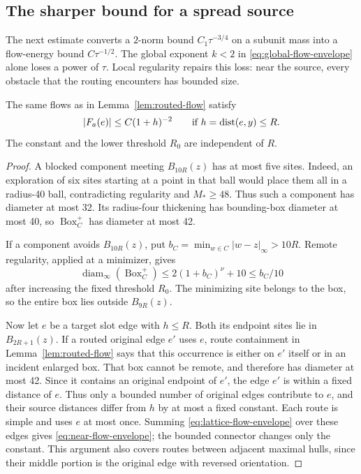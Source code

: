 \subsection{The sharper bound for a spread source}

The next estimate converts a \(2\)-norm bound \(C_1\tau^{-3/4}\)
on a subunit mass into a flow-energy bound \(C\tau^{-1/2}\).
The global exponent \(k<2\) in
\eqref{eq:global-flow-envelope} alone loses a power of \(\tau\).
Local regularity repairs this loss: near the source, every obstacle
that the routing encounters has bounded size.

\begin{lemma}\label{lem:near-flow}
The same flows as in Lemma~\ref{lem:routed-flow} satisfy
\begin{equation}\label{eq:near-flow-envelope}
 |F_a(e)|\le C(1+h)^{-2}
 \qquad\text{if }h=\operatorname{dist}(e,y)\le R.
\end{equation}
The constant and the lower threshold \(R_0\) are independent of \(R\).
\end{lemma}

\begin{proof}
A blocked component meeting \(B_{10R}(z)\) has at most five sites.
Indeed, an exploration of six sites starting at a point in that ball
would place them all in a radius-40 ball, contradicting regularity and
\(M_*\ge48\).  Thus such a component has diameter at most 32.
Its radius-four thickening has bounding-box diameter at most 40, so
\(\operatorname{Box}_C^+\) has diameter at most 42.

If a component avoids \(B_{10R}(z)\), put
\(b_C=\min_{w\in C}|w-z|_\infty>10R\).
Remote regularity, applied at a minimizer, gives
\[
 \operatorname{diam}_\infty(\operatorname{Box}_C^+)
 \le 2(1+b_C)^\nu+10\le b_C/10
\]
after increasing the fixed threshold \(R_0\).
The minimizing site belongs to the box, so the entire box lies outside
\(B_{9R}(z)\).

Now let \(e\) be a target slot edge with \(h\le R\).  Both its
endpoint sites lie in \(B_{2R+1}(z)\).  If a routed original edge
\(e'\) uses \(e\), route containment in Lemma~\ref{lem:routed-flow}
says that this occurrence is either on \(e'\) itself or in an
incident enlarged box.  That box cannot be remote, and therefore has
diameter at most 42.  Since it contains an original endpoint of \(e'\),
the edge \(e'\) is within a fixed distance of \(e\).  Thus only a
bounded number of original edges contribute to \(e\), and their
source distances differ from \(h\) by at most a fixed constant.
Each route is simple and uses \(e\) at most once.  Summing
\eqref{eq:lattice-flow-envelope} over these edges gives
\eqref{eq:near-flow-envelope}; the bounded connector changes only the
constant.  This argument also covers routes between adjacent maximal
hulls, since their middle portion is the original edge with reversed
orientation.
\end{proof}

